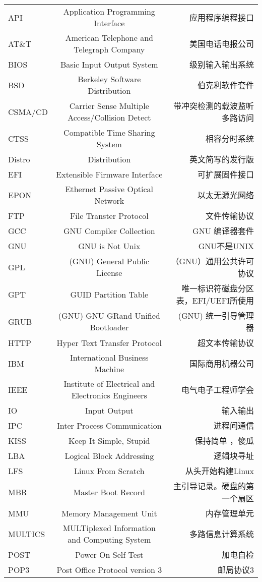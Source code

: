 \begin{landscape}
\begin{center}
\begin{supertabular}{l|c|r}
API & Application Programming Interface & 应用程序编程接口 \\
AT\&T & American Telephone and Telegraph Company & 美国电话电报公司\\
BIOS & Basic Input Output System & 级别输入输出系统\\
BSD & Berkeley Software Distribution & 伯克利软件套件 \\
CSMA/CD & Carrier Sense Multiple Access/Collision Detect & 带冲突检测的载波监听多路访问  \\
CTSS & Compatible Time Sharing System & 相容分时系统 \\
Distro & Distribution & 英文简写的发行版 \\
EFI & Extensible Firmware Interface & 可扩展固件接口 \\
EPON & Ethernet Passive Optical Network & 以太无源光网络\\
FTP & File Transter Protocol & 文件传输协议 \\
GCC & GNU Compiler Collection & GNU 编译器套件 \\
GNU & GNU is Not Unix & GNU不是UNIX \\
GPL & (GNU) General Public License & （GNU）通用公共许可协议 \\
GPT & GUID Partition Table & 唯一标识符磁盘分区表，EFI/UEFI所使用\\
GRUB & (GNU) GNU GRand Unified Bootloader & (GNU) 统一引导管理器 \\
HTTP & Hyper Text Transfer Protocol & 超文本传输协议 \\
IBM & International Business Machine & 国际商用机器公司 \\
IEEE & Institute of Electrical and Electronics Engineers  & 电气电子工程师学会\\
IO & Input Output & 输入输出 \\
IPC & Inter Process Communication & 进程间通信 \\
KISS & Keep It Simple, Stupid& 保持简单 ，傻瓜 \\
LBA & Logical Block Addressing& 逻辑块寻址\\
LFS & Linux From Scratch & 从头开始构建Linux \\
MBR & Master Boot Record & 主引导记录。硬盘的第一个扇区 \\
MMU & Memory Management Unit & 内存管理单元 \\

MULTICS & MULTiplexed Information and Computing System & 多路信息计算系统 \\
POST & Power On Self Test & 加电自检\\
POP3 & Post Office Protocol version 3 & 邮局协议3\\


\end{supertabular}
\end{center}
\end{landscape}
